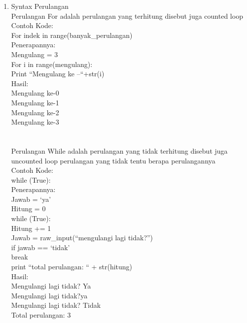 \begin{enumerate}
	\item Syntax Perulangan\\
	Perulangan For adalah perulangan yang terhitung disebut juga counted loop\\
	Contoh Kode:\\	
	For indek in range(banyak\_perulangan)\\
	Penerapannya:\\
	Mengulang = 3\\
	For i in range(mengulang):\\
	Print “Mengulang ke –“+str(i)\\
	Hasil:\\
	Mengulang ke-0\\
	Mengulang ke-1\\
	Mengulang ke-2\\
	Mengulang ke-3\\
	\\
	\\
	Perulangan While adalah perulangan yang tidak terhitung disebut juga uncounted loop perulangan yang 		tidak tentu berapa perulangannya\\
	Contoh Kode:\\
	while (True):\\
	Penerapannya:\\
	Jawab = ‘ya’\\
	Hitung = 0\\
	while (True):\\
	Hitung += 1\\
	Jawab = raw\_input(“mengulangi lagi tidak?”)\\
	if jawab == ‘tidak’\\
	break \\
	print “total perulangan: “ + str(hitung)\\
	Hasil:\\
	Mengulangi lagi tidak? Ya\\
	Mengulangi lagi tidak?ya\\
	Mengulangi lagi tidak? Tidak\\ 
	Total perulangan: 3\\


\end{enumerate}

